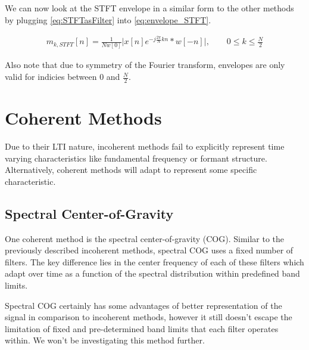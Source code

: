 \documentclass [11pt, proquest] {uwthesis}[2015/03/03]
\begin{document}
We can now look at the STFT envelope in a similar form to the other methods by plugging \ref{eq:STFTasFilter} into \ref{eq:envelope_STFT}.

\begin{align}
\label{eq:STFT_envelope}
m_{k,STFT}[n] =  \frac{1}{Nw[0]}  \Big\vert x[n] e^{-j\frac{2\pi}{N}kn} * w[-n] \Big\vert, \qquad 0 \leq k \leq \frac{N}{2}
\end{align}

Also note that due to symmetry of the Fourier transform, envelopes are only valid for indicies between $0$ and $\frac{N}{2}$.

\section{Coherent Methods}

Due to their LTI nature, incoherent methods fail to explicitly represent time varying characteristics like fundamental frequency or formant structure. \cite{wilson1993design}  Alternatively, coherent methods will adapt to represent some specific characteristic.



\subsection{Spectral Center-of-Gravity}

One coherent method is the spectral center-of-gravity (COG).  Similar to the previously described incoherent methods, spectral COG uses a fixed number of filters.  The key difference lies in the center frequency of each of these filters which adapt over time as a function of the spectral distribution within predefined band limits.

Spectral COG certainly has some advantages of better representation of the signal in comparison to incoherent methods, however it still doesn't escape the limitation of fixed and pre-determined band limits that each filter operates within.  We won't be investigating this method further.
\end{document}
